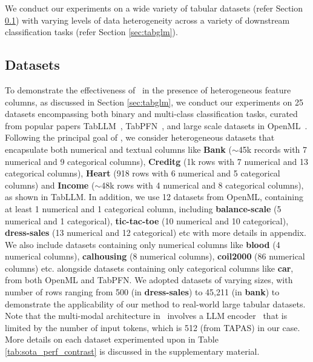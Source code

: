 We conduct our experiments on a wide variety of tabular datasets (refer Section \ref{sec:datasets}) with varying levels of data heterogeneity across a variety of downstream classification tasks (refer Section \ref{sec:tabglm}).



\subsection{Datasets}
\label{sec:datasets}
To demonstrate the effectiveness of \tabglm\ in the presence of heterogeneous feature columns, as discussed in Section \ref{sec:tabglm}, we conduct our experiments on 25 datasets encompassing both binary and multi-class classification tasks, curated from popular papers TabLLM~\cite{tabllm}, TabPFN~\cite{hollmann2022tabpfn}, and large scale datasets in OpenML~\cite{openml2017}.
Following the principal goal of \tabglm, we consider heterogeneous datasets that encapsulate both numerical and textual columns like \textbf{Bank} ($\sim$45k records with 7 numerical and 9 categorical columns), \textbf{Creditg} (1k rows with 7 numerical and 13 categorical columns), \textbf{Heart} (918 rows with 6 numerical and 5 categorical columns) and \textbf{Income} ($\sim$48k rows with 4 numerical and 8 categorical columns), as shown in TabLLM. In addition, we use 12 datasets from OpenML, containing at least 1 numerical and 1 categorical column, including \textbf{balance-scale} (5 numerical and 1 categorical), \textbf{tic-tac-toe} (10 numerical and 10 categorical), \textbf{dress-sales} (13 numerical and 12 categorical) etc with more details in appendix. 
We also include datasets containing only numerical columns like \textbf{blood} (4 numerical columns), \textbf{calhousing} (8 numerical columns), \textbf{coil2000} (86 numerical columns) etc. alongside datasets containing only categorical columns like \textbf{car}, from both OpenML and TabPFN. 
We adopted datasets of varying sizes, with number of rows ranging from 500 (in \textbf{dress-sales}) to 45,211 (in \textbf{bank}) to demonstrate the applicability of our method to real-world large tabular datasets.
Note that the multi-modal architecture in \tabglm\ involves a LLM encoder~\cite{tapas, tapex} that is limited by the number of input tokens, which is 512 (from TAPAS) in our case.
More details on each dataset experimented upon in Table \ref{tab:sota_perf_contrast} is discussed in the supplementary material.

